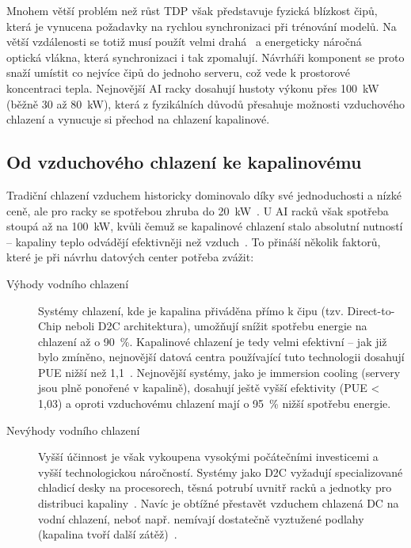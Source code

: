 Mnohem větší problém než růst TDP však představuje fyzická blízkost čipů, která je vynucena požadavky na rychlou synchronizaci při trénování modelů. Na větší vzdálenosti se totiž musí použít velmi drahá~\cite[s.~4]{avelar_ai_2023} a energeticky náročná~\cite[s.~36]{cruzes_data_2025} optická vlákna, která synchronizaci i tak zpomalují. Návrháři komponent se proto snaží umístit co nejvíce čipů do jednoho serveru, což vede k prostorové koncentraci tepla. Nejnovější AI racky dosahují hustoty výkonu přes 100~kW (běžně 30 až 80~kW), která z fyzikálních důvodů přesahuje možnosti vzduchového chlazení a vynucuje si přechod na chlazení kapalinové.~\cite[s.~23]{cruzes_data_2025}

\subsection{Od vzduchového chlazení ke kapalinovému}
\label{subsec:vzduch}

Tradiční chlazení vzduchem historicky dominovalo díky své jednoduchosti a nízké ceně, ale pro racky se spotřebou zhruba do 20~kW~\cite[s.~10]{avelar_ai_2023}. U AI racků však spotřeba stoupá až na 100~kW, kvůli čemuž se kapalinové chlazení stalo absolutní nutností -- kapaliny teplo odvádějí efektivněji než vzduch~\cite[s.~4]{chen_electricity_2025}. To přináší několik faktorů, které je při návrhu datových center potřeba zvážit:

\begin{description}
    \item[Výhody vodního chlazení] Systémy chlazení, kde je kapalina přiváděna pří\-mo k čipu (tzv. Direct-to-Chip neboli D2C architektura), umožňují snížit spotřebu energie na chlazení až o 90~\%. Kapalinové chlazení je tedy velmi efektivní -- jak již bylo zmíněno, nejnovější datová centra používající tuto technologii dosahují PUE nižší než 1,1~\cite{chen_electricity_2025, sheng_power_2026}. Nejnovější systémy, jako je immersion cooling (servery jsou plně ponořené v kapalině), dosahují ještě vyšší efektivity (PUE < 1,03) a oproti vzduchovému chlazení mají o 95~\% nižší spotřebu energie.~\cite[s.~17--19]{cruzes_data_2025}
    \item[Nevýhody vodního chlazení] Vyšší účinnost je však vykoupena vysokými počátečními investicemi a vyšší technologickou náročností. Systémy jako D2C vyžadují specializované chladicí desky na procesorech, těsná potrubí uvnitř racků a jednotky pro distribuci kapaliny~\cite[s.~18]{cruzes_data_2025}. Navíc je obtížné přestavět vzduchem chlazená DC na vodní chlazení, neboť např. nemívají dostatečně vyztužené podlahy (kapalina tvoří další zátěž)~\cite[s.~11]{avelar_ai_2023}.
\end{description}

